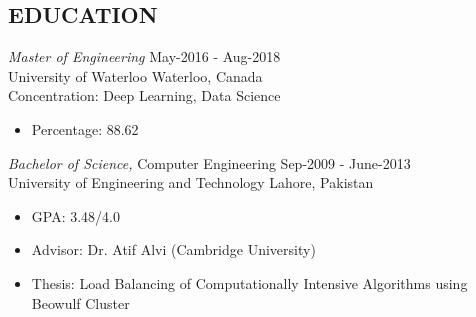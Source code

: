 \documentclass[margin, 10pt]{res} %
\begin{document}
\begin{resume}

\section{EDUCATION}

{\sl Master of Engineering} \hfill May-2016 - Aug-2018 \\
University of Waterloo \hfill Waterloo, Canada \\
Concentration: Deep Learning, Data Science

\begin{itemize} \itemsep -2pt %
\item Percentage: 88.62%
\end{itemize}

{\sl Bachelor of Science,} Computer Engineering \hfill Sep-2009 - June-2013 \\
University of Engineering and Technology \hfill Lahore, Pakistan

\begin{itemize} \itemsep -2pt %
\item GPA: 3.48/4.0
\item Advisor: Dr. Atif Alvi (Cambridge University) 
\item Thesis: Load Balancing of Computationally Intensive Algorithms using Beowulf Cluster

\end{itemize}
 


 

\end{resume}
\end{document}
